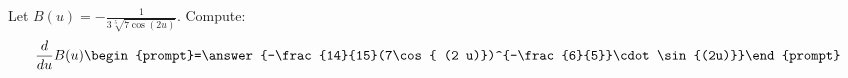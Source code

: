\documentclass{ximera}
\author{Bart Snapp\ Nela Lakos}
\begin{document}
\begin{exercise}
Let $B(u) = -\frac{1}{3 \sqrt[5]{7\cos (2 u)}}$. Compute:
\[
\frac{d}{du}B(u)
\begin{prompt}=\answer{-\frac{14}{15}(7\cos{ (2 u)})^{-\frac{6}{5}}\cdot \sin{(2u)}}\end{prompt}
\]
\end{exercise}
\end{document}
